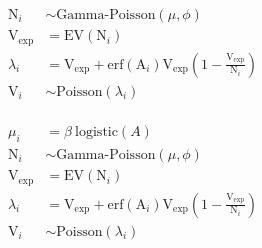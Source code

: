 \documentclass[12pt,preview,border=0]{standalone}
\newcommand\EV{\text{V}_{\text{exp}}}
\newcommand\A{\text{A}_{i}}
\newcommand\N{\text{N}_{i}}
\newcommand\V{\text{V}_{i}}
\begin{document}
$$
\begin{aligned} 
    \N        & \sim \text{Gamma-Poisson}(\mu, \phi) \\
    \EV       &    = \text{EV}(\N) \\
    \lambda_i &    = \EV + \text{erf}(\A) \EV (1 - \frac{\EV}{\N}) \\
    \V        & \sim \text{Poisson}(\lambda_i)
\end{aligned}
$$
\\
$$
\begin{aligned}
    \mu_i     &    = \beta ~  \text{logistic}(A) \\
    \N        & \sim \text{Gamma-Poisson}(\mu, \phi) \\
    \EV       &    = \text{EV}(\N) \\
    \lambda_i &    = \EV + \text{erf}(\A) \EV (1 - \frac{\EV}{\N}) \\
    \V        & \sim \text{Poisson}(\lambda_i)
\end{aligned}
$$
\end{document}
